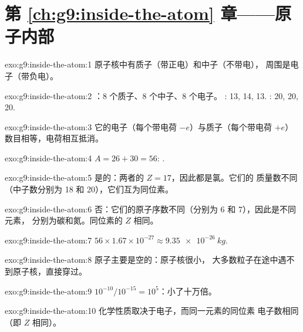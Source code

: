 \section*{第 \ref{ch:g9:inside-the-atom} 章——原子内部}

\begin{solution}{exo:g9:inside-the-atom:1}
原子核中有质子（带正电）和中子（不带电），
周围是电子（带负电）。
\end{solution}

\begin{solution}{exo:g9:inside-the-atom:2}
：8 个质子、8 个中子、8 个电子。
: 13, 14, 13. : 20, 20, 20.
\end{solution}

\begin{solution}{exo:g9:inside-the-atom:3}
它的电子（每个带电荷 $-e$）与质子（每个带电荷 $+e$）
数目相等，电荷相互抵消。
\end{solution}

\begin{solution}{exo:g9:inside-the-atom:4}
$A = 26 + 30 = 56$: .
\end{solution}

\begin{solution}{exo:g9:inside-the-atom:5}
是的：两者的 $Z = 17$，因此都是氯。它们的
质量数不同（中子数分别为 18 和 20），它们互为同位素。
\end{solution}

\begin{solution}{exo:g9:inside-the-atom:6}
否：它们的原子序数不同（分别为 6 和 7），因此是不同元素，
分别为碳和氮。同位素的 $Z$ 相同。
\end{solution}

\begin{solution}{exo:g9:inside-the-atom:7}
$56 \times 1.67 \times 10^{-27} \approx \qty{9.35e-26}{kg}$.
\end{solution}

\begin{solution}{exo:g9:inside-the-atom:8}
原子主要是空的：原子核很小，
大多数粒子在途中遇不到原子核，直接穿过。
\end{solution}

\begin{solution}{exo:g9:inside-the-atom:9}
$10^{-10} / 10^{-15} = 10^{5}$：小了十万倍。
\end{solution}

\begin{solution}{exo:g9:inside-the-atom:10}
化学性质取决于电子，而同一元素的同位素
电子数相同（即 $Z$ 相同）。
\end{solution}

